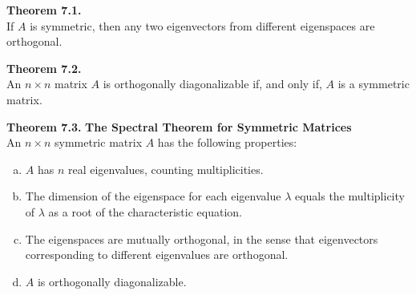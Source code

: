 \documentclass[10pt]{book}
\newenvironment{boxthm}{\begin{mdframed}[backgroundcolor=gray!30,nobreak=true]}{\end{mdframed}}
\begin{document}
\begin{boxthm}
	\textbf{Theorem 7.1.} \\
	If $A$ is symmetric, then any two eigenvectors from different eigenspaces are orthogonal.
\end{boxthm}
\vspace{-1ex}
\begin{boxthm}
	\textbf{Theorem 7.2.} \\
	An $n\times n$ matrix $A$ is orthogonally diagonalizable if, and only if, $A$ is a symmetric matrix.
\end{boxthm}
\vspace{-1ex}
\begin{boxthm}
	\textbf{Theorem 7.3.} %
	\textbf{The Spectral Theorem for Symmetric Matrices} \\
	An $n\times n$ symmetric matrix $A$ has the following properties:
	\vspace{-1em}
	\begin{multicols}{2}
		\begin{enumerate}[(a)]\itemsep=0em
			\item $A$ has $n$ real eigenvalues, counting multiplicities.
			\item The dimension of the eigenspace for each eigenvalue $\lambda$ equals the multiplicity of $\lambda$ as a root of the characteristic equation.
			\item The eigenspaces are mutually orthogonal, in the sense that eigenvectors corresponding to different eigenvalues are orthogonal.
			\item $A$ is orthogonally diagonalizable.
		\end{enumerate}
	\end{multicols}
\end{boxthm}
\end{document}

